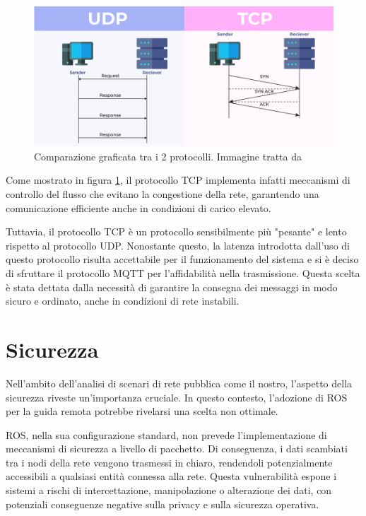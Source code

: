 \begin{figure}[H]
  \centering
  \includegraphics[width=1\textwidth]{figures/tcp_vs_udp_geeksforgeeks.png}
  \caption{Comparazione graficata tra i 2 protocolli. Immagine tratta da \cite{TCPvsUDP_geeksforgeeks}}
  \label{tcp_v_udp}
\end{figure}

\noindent Come mostrato in figura \ref{tcp_v_udp}, il protocollo TCP implementa infatti meccanismi di controllo del flusso che evitano la congestione della rete, garantendo una comunicazione efficiente anche in condizioni di carico elevato.

\noindent Tuttavia, il protocollo TCP è un protocollo sensibilmente più "pesante" e lento rispetto al protocollo UDP. Nonostante questo, la latenza introdotta dall'uso di questo protocollo risulta accettabile per il funzionamento del sistema e si è deciso di sfruttare il protocollo MQTT per l'affidabilità nella trasmissione. Questa scelta è stata dettata dalla necessità di garantire la consegna dei messaggi in modo sicuro e ordinato, anche in condizioni di rete instabili.

\section{Sicurezza}
\noindent Nell'ambito dell'analisi di scenari di rete pubblica come il nostro, l'aspetto della sicurezza riveste un'importanza cruciale. In questo contesto, l'adozione di ROS per la guida remota potrebbe rivelarsi una scelta non ottimale.

\noindent ROS, nella sua configurazione standard, non prevede l'implementazione di meccanismi di sicurezza a livello di pacchetto. Di conseguenza, i dati scambiati tra i nodi della rete vengono trasmessi in chiaro, rendendoli potenzialmente accessibili a qualsiasi entità connessa alla rete. Questa vulnerabilità espone i sistemi a rischi di intercettazione, manipolazione o alterazione dei dati, con potenziali conseguenze negative sulla privacy e sulla sicurezza operativa.

